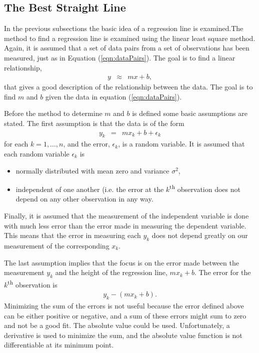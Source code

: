 \documentclass[12pt]{article}
\begin{document}
\subsection{The Best Straight Line}

In the previous subsections the basic idea of a regression line is
examined.The method to find a regression line is examined using the
linear least square method. Again, it is assumed that a set of data
pairs from a set of observations has been measured, just as in
Equation (\ref{eqn:dataPairs}). The goal is to find a linear
relationship,
\begin{eqnarray*}
  y & \approx & m x + b,
\end{eqnarray*}
that gives a good description of the relationship between the data.
The goal is to find $m$ and $b$ given the data in equation
(\ref{eqn:dataPairs}).

Before the method to determine $m$ and $b$ is defined some basic
assumptions are stated. The first assumption is that the data is of
the form
\begin{eqnarray*}
  y_k & = & m x_k + b + \epsilon_k
\end{eqnarray*}
for each $k=1,\ldots,n$, and the error, $\epsilon_k$, is a random
variable. It is assumed that each random variable $\epsilon_k$ is
\begin{itemize}
\item normally distributed with mean zero and variance $\sigma^2$,
\item independent of one another (i.e. the error at the
  $k$\textsuperscript{th} observation does not depend on any other
  observation in any way.
\end{itemize}
Finally, it is assumed that the measurement of the independent
variable is done with much less error than the error made in measuring
the dependent variable. This means that the error in measuring each
$y_k$ does not depend greatly on our measurement of the corresponding
$x_k$.

The last assumption implies that the focus is on the error made
between the measurement $y_k$ and the height of the regression line,
$m x_k+b$. The error for the $k$\textsuperscript{th} observation is
\begin{eqnarray*}
  y_k - (m x_k + b).
\end{eqnarray*}
Minimizing the sum of the errors is not useful because the error
defined above can be either positive or negative, and a sum of these
errors might sum to zero and not be a good fit. The absolute value
could be used. Unfortunately, a derivative is used to minimize the
sum, and the absolute value function is not differentiable at its
minimum point.
\end{document}
